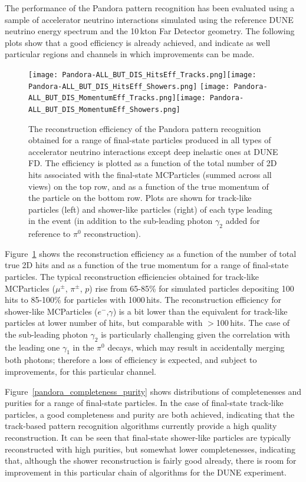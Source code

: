 The performance of the Pandora pattern recognition has been evaluated using a sample of accelerator neutrino interactions simulated using the reference DUNE neutrino energy spectrum and the 10\,kton Far Detector geometry. The following plots show that a good efficiency is already achieved, and indicate as well particular regions and channels in which improvements can be made. 

\begin{figure}[!ht]
\centering
\texttt{[image: Pandora-ALL\_BUT\_DIS\_HitsEff\_Tracks.png]}\texttt{[image: Pandora-ALL\_BUT\_DIS\_HitsEff\_Showers.png]}
\texttt{[image: Pandora-ALL\_BUT\_DIS\_MomentumEff\_Tracks.png]}\texttt{[image: Pandora-ALL\_BUT\_DIS\_MomentumEff\_Showers.png]}
\caption{The reconstruction efficiency of the Pandora pattern recognition obtained for a range of final-state particles produced in all types of accelerator neutrino interactions except deep inelastic ones at DUNE FD. The efficiency is plotted as a function of the total number of 2D hits associated with the final-state MCParticles (summed across all views) on the top row, and as a function of the true momentum of the particle on the bottom row. Plots are shown for track-like particles (left) and shower-like particles (right) of each type leading in the event (in addition to the sub-leading photon $\gamma_2$ added for reference to $\pi^0$ reconstruction).}
\label{pandora_particle_efficiency}
\end{figure}

Figure~\ref{pandora_particle_efficiency} shows the reconstruction efficiency as a function of the number of total true 2D hits and as a function of the true momentum for a range of final-state particles. The typical reconstruction efficiencies obtained for track-like MCParticles ($\mu^{\pm}$, $\pi^{\pm}$, $p$) rise from 65-85\% for simulated particles depositing 100\,hits to 85-100\% for particles with 1000\,hits. The reconstruction efficiency for shower-like MCParticles ($e^{-}$,$\gamma$) is a bit lower than the equivalent for track-like particles at lower number of hits, but comparable with $>$100\,hits. The case of the sub-leading photon $\gamma_2$ is particularly challenging given the correlation with the leading one $\gamma_1$ in the $\pi^0$ decays, which may result in accidentally merging both photons; therefore a loss of efficiency is expected, and subject to improvements, for this particular channel. 

Figure~\ref{pandora_completeness_purity} shows distributions of completenesses and purities for a range of final-state particles. In the case of final-state track-like particles, a good completeness and purity are both achieved, indicating that the track-based pattern recognition algorithms currently provide a high quality reconstruction. It can be seen that final-state shower-like particles are typically reconstructed with high purities, but somewhat lower completenesses, indicating that, although the shower reconstruction is fairly good already, there is room for improvement in this particular chain of algorithms for the DUNE experiment. 

